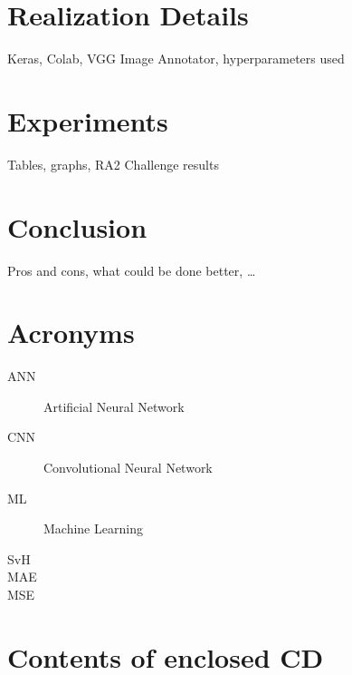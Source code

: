\documentclass[thesis=B,english]{FITthesis}[2019/12/23]
\begin{document}
\chapter{Realization Details}

Keras, Colab, VGG Image Annotator, hyperparameters used

\chapter{Experiments}

Tables, graphs, RA2 Challenge results

\chapter{Conclusion}

Pros and cons, what could be done better, \dots




\appendix

\chapter{Acronyms}

\begin{description}
	\item[ANN] Artificial Neural Network
	\item[CNN] Convolutional Neural Network
	\item[ML] Machine Learning
	\item[SvH]
	\item[MAE]
	\item[MSE]
\end{description}


\chapter{Contents of enclosed CD}


\begin{figure}
\end{figure}
\end{document}
